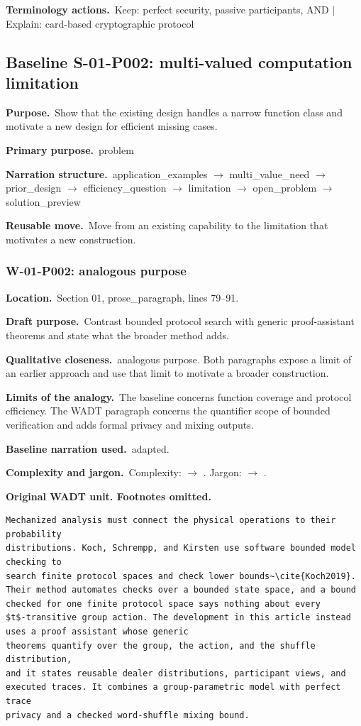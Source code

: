 \documentclass[10pt]{article}
\renewcommand{\cite}[1]{\textnormal{[\texttt{\detokenize{#1}}]}}\renewcommand{\label}[1]{}
\newcommand{\Field}[2]{\textbf{#1}\ #2\par}\newcommand{\Tag}[1]{\fcolorbox{black!25}{black!4}{\strut\scriptsize #1}}
\begin{document}
\Field{Terminology actions.}{Keep: perfect security, passive participants, AND | Explain: card-based cryptographic protocol}
\par\smallskip
\clearpage\subsection{Baseline S-01-P002: multi-valued computation limitation}
\colorbox{BaselineBlue}{\parbox{0.97\textwidth}{\Field{Purpose.}{Show that the existing design handles a narrow function class and motivate a new design for efficient missing cases.}\Field{Primary purpose.}{problem}\Field{Narration structure.}{application\_examples $\rightarrow$ multi\_value\_need $\rightarrow$ prior\_design $\rightarrow$ efficiency\_question $\rightarrow$ limitation $\rightarrow$ open\_problem $\rightarrow$ solution\_preview}\Field{Reusable move.}{Move from an existing capability to the limitation that motivates a new construction.}}}
\subsubsection*{W-01-P002: analogous purpose}
\Field{Location.}{Section 01, prose\_paragraph, lines 79--91.}
\Field{Draft purpose.}{Contrast bounded protocol search with generic proof-assistant theorems and state what the broader method adds.}
\Field{Qualitative closeness.}{analogous purpose. Both paragraphs expose a limit of an earlier approach and use that limit to motivate a broader construction.}
\Field{Limits of the analogy.}{The baseline concerns function coverage and protocol efficiency. The WADT paragraph concerns the quantifier scope of bounded verification and adds formal privacy and mixing outputs.}
\Field{Baseline narration used.}{adapted.}
\Field{Complexity and jargon.}{Complexity: \Tag{medium} $\rightarrow$ \Tag{medium}. Jargon: \Tag{high} $\rightarrow$ \Tag{medium}.}
\textbf{Original WADT unit. Footnotes omitted.}
\begin{lstlisting}
Mechanized analysis must connect the physical operations to their probability
distributions. Koch, Schrempp, and Kirsten use software bounded model checking to
search finite protocol spaces and check lower bounds~\cite{Koch2019}.
Their method automates checks over a bounded state space, and a bound
checked for one finite protocol space says nothing about every
$t$-transitive group action. The development in this article instead uses a proof assistant whose generic
theorems quantify over the group, the action, and the shuffle distribution,
and it states reusable dealer distributions, participant views, and
executed traces. It combines a group-parametric model with perfect trace
privacy and a checked word-shuffle mixing bound.
\end{lstlisting}
\end{document}
